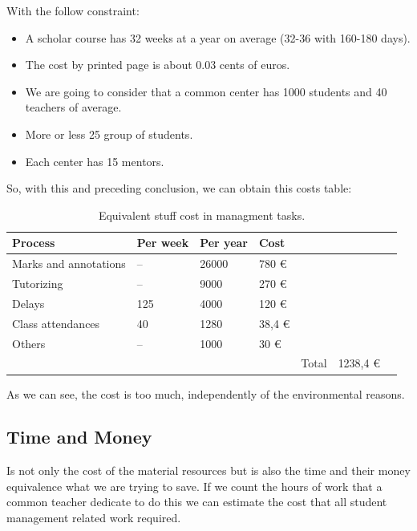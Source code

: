 With the follow constraint:

\begin{itemize}
  \setlength{\itemsep}{0pt}
\item A scholar course has 32 weeks at a year on average (32-36 with 160-180 days).
\item The cost by printed page is about 0.03 cents of euros.
\item We are going to consider that a common center has 1000 students and 40 teachers of average.
\item More or less 25 group of students.
\item Each center has 15 mentors.
\end{itemize}

So, with this and preceding conclusion, we can obtain this costs table:

\begin{table}[H]
\centering

\begin{tabular}{@{}lllllll@{}}

Process & Per week  & Per year  & Cost  \\
\midrule

Marks and annotations   &  --  &  26000  &   780      \euro  \\
Tutorizing              &  --  &  9000   &   270      \euro  \\
Delays                  &  125 &  4000   &   120      \euro  \\
Class attendances       &  40  &  1280   &   38,4     \euro  \\
Others                  &  --  &  1000   &   30       \euro  \\

\midrule
& & & & Total & 1238,4 \euro \\
\end{tabular}
\caption{Equivalent stuff cost in managment tasks. }
\label{my-label}
\end{table}


As we can see, the cost is too much, independently of the environmental reasons.

\subsection{Time and Money}

Is not only the cost of the material resources but is also the time and their money
equivalence what we are trying to save.  If we count the hours of work that a
common teacher dedicate to do this we can estimate the cost that all student
management related work required.


